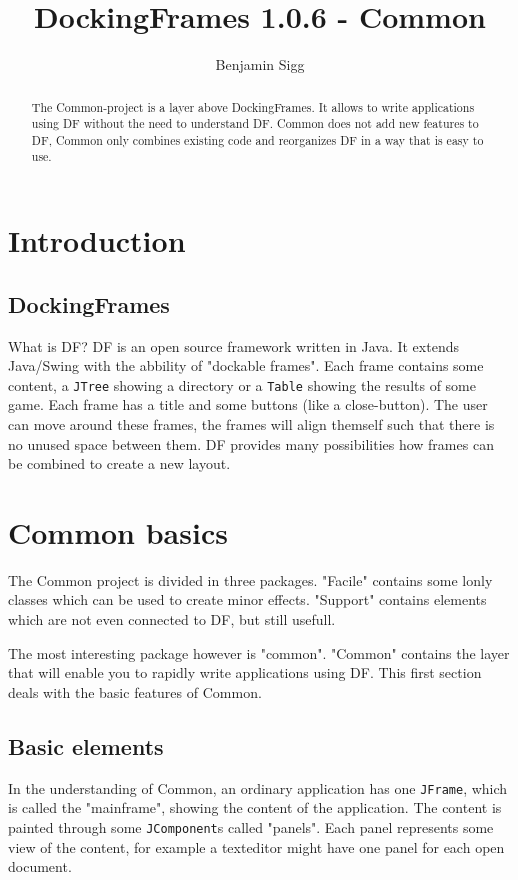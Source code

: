 \documentclass[a4paper,10pt]{article}
\title{DockingFrames 1.0.6 - Common}
\author{Benjamin Sigg}
\newcommand{\src}[1]{\lstinline[basicstyle=\ttfamily]|#1|}
\begin{document}
\maketitle
\tableofcontents
\newpage

\begin{abstract}
The Common-project is a layer above DockingFrames. It allows to write applications using DF without the need to understand DF. Common does not add new features to DF, Common only combines existing code and reorganizes DF in a way that is easy to use.
\end{abstract}

\section{Introduction}
\subsection{DockingFrames}
What is DF? DF is an open source framework written in Java. It extends Java/Swing with the abbility of "dockable frames". Each frame contains some content, a \src{JTree} showing a directory or a \src{Table} showing the results of some game. Each frame has a title and some buttons (like a close-button). The user can move around these frames, the frames will align themself such that there is no unused space between them. DF provides many possibilities how frames can be combined to create a new layout.

\section{Common basics}
The Common project is divided in three packages. "Facile" contains some lonly classes which can be used to create minor effects. "Support" contains elements which are not even connected to DF, but still usefull.

The most interesting package however is "common". "Common" contains the layer that will enable you to rapidly write applications using DF. This first section deals with the basic features of Common.

\subsection{Basic elements}
In the understanding of Common, an ordinary application has one \src{JFrame}, which is called the "mainframe", showing the content of the application. The content is painted through some \src{JComponent}s called "panels". Each panel represents some view of the content, for example a texteditor might have one panel for each open document.
\end{document}
